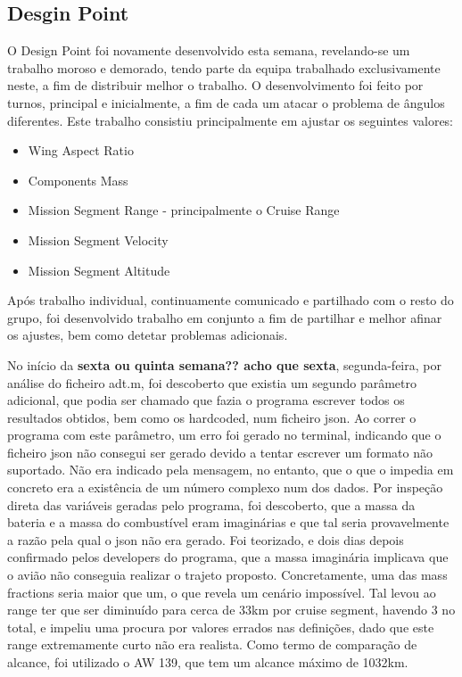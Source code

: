 \subsection{Desgin Point}
O Design Point foi novamente desenvolvido esta semana, revelando-se um trabalho moroso e demorado, tendo parte da equipa trabalhado exclusivamente neste, a fim de distribuir melhor o trabalho. O desenvolvimento foi feito por turnos, principal e inicialmente, a fim de cada um atacar o problema de ângulos diferentes. Este trabalho consistiu principalmente em ajustar os seguintes valores:
\begin{itemize}
    \item Wing Aspect Ratio
    \item Components Mass
    \item Mission Segment Range - principalmente o Cruise Range
    \item Mission Segment Velocity
    \item Mission Segment Altitude
\end{itemize}
Após trabalho individual, continuamente comunicado e partilhado com o resto do grupo, foi desenvolvido trabalho em conjunto a fim de partilhar e melhor afinar os ajustes, bem como detetar problemas adicionais.\par
No início da \textbf{sexta ou quinta semana?? acho que sexta}, segunda-feira, por análise do ficheiro adt.m, foi descoberto que existia um segundo parâmetro adicional, que podia ser chamado que fazia o programa escrever todos os resultados obtidos, bem como os hardcoded, num ficheiro json. Ao correr o programa com este parâmetro, um erro foi gerado no terminal, indicando que o ficheiro json não consegui ser gerado devido a tentar escrever um formato não suportado. Não era indicado pela mensagem, no entanto, que o que o impedia em concreto era a existência de um número complexo num dos dados. Por inspeção direta das variáveis geradas pelo programa, foi descoberto, que a massa da bateria e a massa do combustível eram imaginárias e que tal seria provavelmente a razão pela qual o json não era gerado. Foi teorizado, e dois dias depois confirmado pelos developers do programa, que a massa imaginária implicava que o avião não conseguia realizar o trajeto proposto. Concretamente, uma das mass fractions seria maior que um, o que revela um cenário impossível. Tal levou ao range ter que ser diminuído para cerca de 33km por cruise segment, havendo 3 no total, e impeliu uma procura por valores errados nas definições, dado que este range extremamente curto não era realista. Como termo de comparação de alcance, foi utilizado o AW 139, que tem um alcance máximo de 1032km.\par

